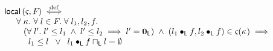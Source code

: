%
%
\[
\begin{array}{l}
	\textsf{local}\left(\varsigma_{}, F_{}\right) \stackrel{\mathrm{def}}{\iff}\\
	\hspace*{0.5cm}
	\forall\; \kappa_{}.\; \forall\; l \in F_{}.\; \forall\; l_1, l_2, f.\;\\
	\hspace*{0.8cm} (\forall\; l'.\; l' \leq l_1 \;\land\; l' \leq l_2 \implies l' = \mathbf{0}_{\textsf{L}}) \;\land\; (l_1 \bullet_{\textsf{L}} f, l_2 \bullet_{\textsf{L}} f) \in \varsigma_{}(\kappa_{})  \implies \\
	 \hspace*{1cm} l_1 \leq l \;\;\lor\;\; l_1 \bullet_{\textsf{L}} f \sqcap_{\textsf{L}} l = \emptyset\\
\end{array}
\]
%
%	
%	
%	
%	
